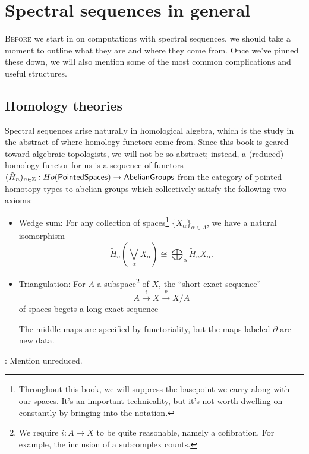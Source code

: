 \chapter{Spectral sequences in general}

\lettrine[lines=1]{B}{efore} we start in on computations with spectral sequences, we should take a moment to outline what they are and where they come from.  Once we've pinned these down, we will also mention some of the most common complications and useful structures. 

\section{Homology theories}

Spectral sequences arise naturally in homological algebra, which is the study in the abstract of where homology functors come from.  Since this book is geared toward algebraic topologists, we will not be so abstract; instead, a (reduced) homology functor for us is a sequence of functors $(\tilde H_n)_{n \in \mathbb{Z}}: Ho(\mathsf{PointedSpaces}) \to \mathsf{AbelianGroups}$ from the category of pointed homotopy types to abelian groups which collectively satisfy the following two axioms:
\begin{itemize}
\item Wedge sum: For any collection of spaces\footnote{Throughout this book, we will suppress the basepoint we carry along with our spaces.  It's an important technicality, but it's not worth dwelling on constantly by bringing into the notation.} $\{X_\alpha\}_{\alpha \in A}$, we have a natural isomorphism \[\tilde H_n \left( \bigvee_\alpha X_\alpha \right) \cong \bigoplus_\alpha \tilde H_n X_\alpha.\]
\item Triangulation: For $A$ a subspace\footnote{We require $i: A \to X$ to be quite reasonable, namely a cofibration.  For example, the inclusion of a subcomplex counts.} of $X$, the ``short exact sequence'' \[A \xrightarrow{i} X \xrightarrow{p} X/A\] of spaces begets a long exact sequence
\begin{center}
\end{center}
The middle maps are specified by functoriality, but the maps labeled $\partial$ are new data.
\end{itemize}
\TODO: Mention unreduced.

